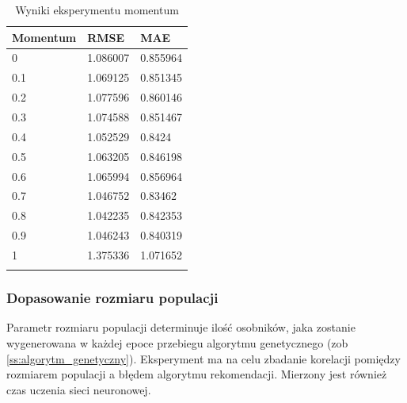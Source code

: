 \documentclass[twoside]{iisthesis}
\begin{document}
		\begin{longtable}{lll}
			\label{tab:expmomentum}
			\textbf{Momentum} & \textbf{RMSE} & \textbf{MAE} \\
			\hline
			0        & 1.086007 & 0.855964 \\
			0.1      & 1.069125 & 0.851345 \\
			0.2      & 1.077596 & 0.860146 \\
			0.3      & 1.074588 & 0.851467 \\
			0.4      & 1.052529 & 0.8424   \\
			0.5      & 1.063205 & 0.846198 \\
			0.6      & 1.065994 & 0.856964 \\
			0.7      & 1.046752 & 0.83462  \\
			0.8      & 1.042235 & 0.842353 \\
			0.9      & 1.046243 & 0.840319 \\
			1        & 1.375336 & 1.071652 \\
			\caption{Wyniki eksperymentu momentum}
		\end{longtable}
					
		\subsubsection{Dopasowanie rozmiaru populacji}
	
		Parametr rozmiaru populacji determinuje ilość osobników, jaka zostanie wygenerowana w każdej epoce przebiegu algorytmu genetycznego (zob \ref{ss:algorytm_genetyczny}). Eksperyment ma na celu zbadanie korelacji pomiędzy rozmiarem populacji a błędem algorytmu rekomendacji. Mierzony jest również czas uczenia sieci neuronowej.
		
\end{document}
